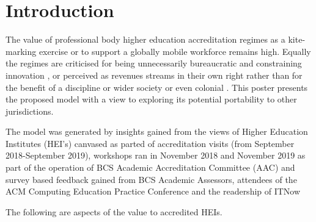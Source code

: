 \documentclass[sigconf]{acmart}
\begin{document}





\maketitle

\section{Introduction}
The value of professional body higher education accreditation regimes as a kite-marking exercise or to support a globally mobile workforce \cite{Knight_2015} remains high. Equally the regimes are criticised for being unnecessarily bureaucratic and constraining innovation \cite{Harvey2004}, or perceived as revenues streams in their own right rather than for the benefit of a discipline or wider society \cite{Knight_2015} or even colonial \cite{Mutereko2017}.  This poster presents the proposed model with a view to exploring its potential portability to other jurisdictions.

The model was generated by insights gained from the views of Higher Education Institutes (HEI's) canvased as parted of accreditation visits (from September 2018-September 2019), workshops ran in November 2018 and November 2019 as part of the operation of BCS Academic Accreditation Committee (AAC) and survey based feedback gained from BCS Academic Assessors,  attendees of the ACM Computing Education Practice Conference \cite{CrickEtAl2020Cep} and the readership of ITNow \cite{CrickEtAl2020ITNow}

The following are aspects of the value to accredited HEIs.
\end{document}
